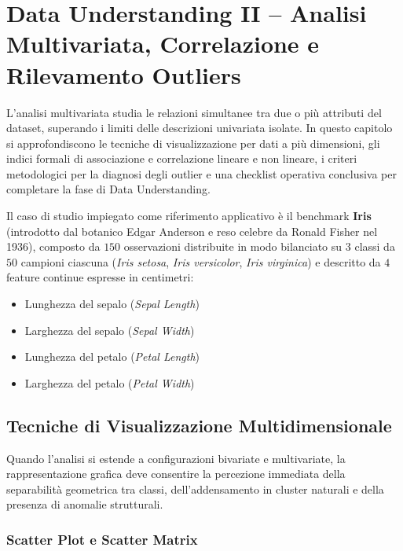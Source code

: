 \chapter{Data Understanding II -- Analisi Multivariata, Correlazione e Rilevamento Outliers}
\label{chap:dm-data-understanding-multivariate-outliers}

L'analisi multivariata studia le relazioni simultanee tra due o più attributi del dataset, superando i limiti delle descrizioni univariata isolate. In questo capitolo si approfondiscono le tecniche di visualizzazione per dati a più dimensioni, gli indici formali di associazione e correlazione lineare e non lineare, i criteri metodologici per la diagnosi degli outlier e una checklist operativa conclusiva per completare la fase di Data Understanding.

Il caso di studio impiegato come riferimento applicativo è il benchmark \textbf{Iris} (introdotto dal botanico Edgar Anderson e reso celebre da Ronald Fisher nel 1936), composto da $150$ osservazioni distribuite in modo bilanciato su $3$ classi da $50$ campioni ciascuna (\textit{Iris setosa}, \textit{Iris versicolor}, \textit{Iris virginica}) e descritto da $4$ feature continue espresse in centimetri:
\begin{itemize}[noitemsep]
    \item Lunghezza del sepalo (\textit{Sepal Length})
    \item Larghezza del sepalo (\textit{Sepal Width})
    \item Lunghezza del petalo (\textit{Petal Length})
    \item Larghezza del petalo (\textit{Petal Width})
\end{itemize}

\section{Tecniche di Visualizzazione Multidimensionale}
\label{sec:dm-multivariate-visualization}

Quando l'analisi si estende a configurazioni bivariate e multivariate, la rappresentazione grafica deve consentire la percezione immediata della separabilità geometrica tra classi, dell'addensamento in cluster naturali e della presenza di anomalie strutturali.

\subsection{Scatter Plot e Scatter Matrix}

